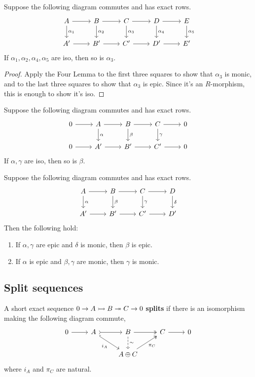 \documentclass[twoside,10pt]{report}
\begin{document}
\begin{thrm}
Suppose the following diagram commutes and has exact rows.
\[
\begin{tikzcd}
	A\rar\dar{\alpha_1} & B\rar\dar{\alpha_2} & C\rar\dar{\alpha_3} & D\rar\dar{\alpha_4} & E\dar{\alpha_5} \\
	A'\rar & B'\rar & C'\rar & D'\rar & E'
\end{tikzcd}
\] 
If $\alpha_1,\alpha_2,\alpha_4,\alpha_5$ are iso, then so is $\alpha_3$.
\end{thrm}
\begin{proof}
	Apply the Four Lemma to the first three squares to show that $\alpha_3$ is monic, and to the last three squares to show that $\alpha_3$ is epic. Since it's an $R$-morphism, this is enough to show it's iso.
\end{proof}

\begin{cor}
Suppose the following diagram commutes and has exact rows.
\[
\begin{tikzcd}
	0\rar & A\rar\dar{\alpha} & B\rar\dar{\beta} & C\rar\dar{\gamma} & 0 \\
        0\rar & A'\rar & B'\rar & C'\rar & 0
\end{tikzcd}
\] 
If $\alpha,\gamma$ are iso, then so is $\beta$.
\end{cor}

\begin{thrm}
Suppose the following diagram commutes and has exact rows.
\[
\begin{tikzcd}
	A \rar\dar{\alpha} & B \rar\dar{\beta} & C\rar\dar{\gamma} & D\dar{\delta} \\
	A'\rar & B'\rar & C'\rar & D'
\end{tikzcd}
\] Then the following hold:
\begin{enumerate}
	\item If $\alpha,\gamma$ are epic and $\delta$ is monic, then $\beta$ is epic.
	\item If $\alpha$ is epic and $\beta,\gamma$ are monic, then $\gamma$ is monic.
\end{enumerate}
\end{thrm}

\subsection{Split sequences}

\begin{defn}[]
A short exact sequence $0\to A\rightarrowtail B\twoheadrightarrow C\to 0$ \textbf{splits} if there is an isomorphism making the following diagram commute,
\[
	\begin{tikzcd}
		0 \rar & A \rar[tail]\arrow[dr,hook,"i_A"'] & B \rar[two heads]\dar[dashed]{\sim} & C \rar & 0 \\
		       & & A \oplus C \arrow[ur,two heads,"\pi_C"']
	\end{tikzcd}
\]
where $i_A$ and $\pi_C$ are natural.
\end{defn}
\end{document}
